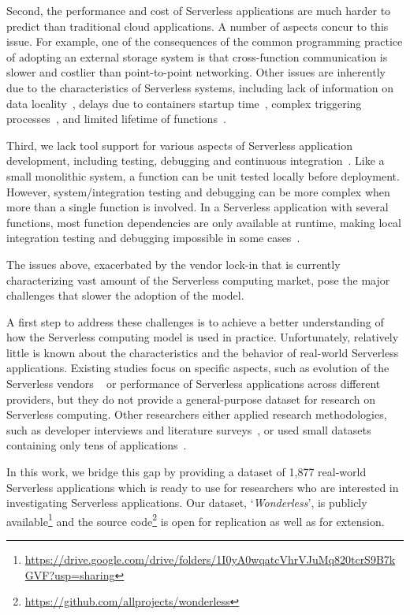 Second, the performance and cost of Serverless applications are much harder to 
predict than traditional cloud applications. A number of aspects concur 
to this issue.
For example, one of the consequences of the common programming practice
of adopting an external storage system is that cross-function communication 
is slower and costlier than point-to-point networking.
Other issues are inherently due to the characteristics of Serverless systems,
including lack of information on data locality~\cite{DBLP:journals/corr/abs-1902-03383},
delays due to containers startup time~\cite{manner2018cold}, 
complex triggering processes~\cite{pelle2019towards}, and
limited lifetime of functions~\cite{hellerstein2018serverless}.

Third, we lack tool support for various aspects of
Serverless application development, including testing, debugging 
and continuous integration~\cite{lenarduzzi2020serverless,nupponen2020serverless}.
Like a small monolithic system, a function can be unit tested 
locally before deployment. 
However, system/integration testing and debugging can 
be more complex when more than a single function is involved. 
In a Serverless application with several functions, 
most function
dependencies are only available at runtime, 
making local integration testing and debugging impossible in 
some cases~\cite{leitner2019mixed}.


The issues above, exacerbated by the vendor lock-in that is currently 
characterizing vast amount of the Serverless computing market, 
pose the major challenges that slower the adoption of the \faas model. 

A first step to address these challenges is to achieve a 
better understanding of how the Serverless computing model is used in practice. 
Unfortunately, relatively little is known about the characteristics 
and the behavior of real-world Serverless applications. Existing studies focus 
on specific aspects, such as evolution of the Serverless vendors ~\cite{spillner2019quantitative} 
or performance of Serverless applications across different providers\cite{wang2018peeking,lloyd2018serverless},
but they do not provide a general-purpose dataset for research on Serverless computing.
Other researchers either applied research methodologies, 
such as developer interviews and literature surveys~\cite{leitner2019mixed},
or used small datasets containing only tens of applications~\cite{eismann2020serverless}.


In this work, we bridge this gap by providing a dataset of 1,877 real-world Serverless 
applications which is ready to use for researchers who are interested in investigating
Serverless applications. Our dataset, `\emph{Wonderless}', is publicly 
available\footnote{\url{https://drive.google.com/drive/folders/1I0yA0wqatcVhrVJuMq820tcrS9B7kGVF?usp=sharing}} 
and the source code\footnote{\url{https://github.com/allprojects/wonderless}} 
is open for replication as well as for extension.











